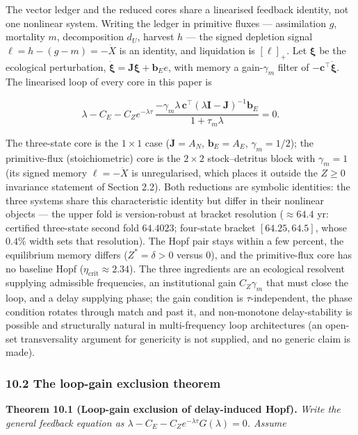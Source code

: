 \documentclass[11pt]{article}
\begin{document}
The vector ledger and the reduced cores share a linearised feedback
identity, not one nonlinear system. Writing the ledger in primitive
fluxes --- assimilation \(g\), mortality \(m\), decomposition \(d_U\),
harvest \(h\) --- the signed depletion signal
\(\ell = h - (g - m) = -\dot X\) is an identity, and liquidation is
\([\ell]_+\). Let \(\boldsymbol{\xi}\) be the ecological perturbation,
\(\dot{\boldsymbol{\xi}} = \mathbf{J}\boldsymbol{\xi} + \mathbf{b}_E e\),
with memory a gain-\(\gamma_m\) filter of
\(-\mathbf{c}^\top\dot{\boldsymbol{\xi}}\). The linearised loop of every
core in this paper is

\[\lambda - C_E - C_Z e^{-\lambda\tau}\, \frac{-\gamma_m\lambda\,\mathbf{c}^\top(\lambda\mathbf{I} - \mathbf{J})^{-1}\mathbf{b}_E}{1 + \tau_m\lambda} = 0. \tag{14}\]

The three-state core is the \(1\times1\) case (\(\mathbf{J} = A_N\),
\(\mathbf{b}_E = A_E\), \(\gamma_m = 1/2\)); the primitive-flux
(stoichiometric) core is the \(2\times2\) stock--detritus block with
\(\gamma_m = 1\) (its signed memory \(\ell = -\dot X\) is unregularised,
which places it outside the \(Z \ge 0\) invariance statement of Section
2.2). Both reductions are symbolic identities: the three systems share
this characteristic identity but differ in their nonlinear objects ---
the upper fold is version-robust at bracket resolution (\(\approx64.4\)
yr: certified three-state second fold \(64.4023\); four-state bracket
\([64.25, 64.5]\), whose \(0.4\%\) width sets that resolution). The Hopf
pair stays within a few percent, the equilibrium memory differs
(\(Z^* = \delta > 0\) versus \(0\)), and the primitive-flux core has no
baseline Hopf (\(\eta_{\mathrm{crit}} \approx 2.34\)). The three
ingredients are an ecological resolvent supplying admissible
frequencies, an institutional gain \(C_Z\gamma_m\) that must close the
loop, and a delay supplying phase; the gain condition is
\(\tau\)-independent, the phase condition rotates through match and past
it, and non-monotone delay-stability is possible and structurally
natural in multi-frequency loop architectures (an open-set
transversality argument for genericity is not supplied, and no generic
claim is made).

\subsubsection{10.2 The loop-gain exclusion
theorem}\label{the-loop-gain-exclusion-theorem}

\textbf{Theorem 10.1 (Loop-gain exclusion of delay-induced Hopf).}
\emph{Write the general feedback equation as
\(\lambda - C_E - C_Z e^{-\lambda\tau}G(\lambda) = 0\). Assume}
\end{document}
